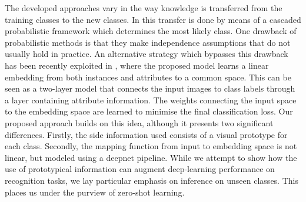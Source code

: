 \documentclass{bmvc2k}
\begin{document}
The developed approaches vary in the way knowledge is transferred from the training classes 
to the new classes. In \cite{Lampert2014,Suzuki2014} this transfer is done by
means of a cascaded probabilistic framework which determines the most likely class. One drawback of
probabilistic methods is that they make independence assumptions that do not
usually hold in practice. An alternative strategy which bypasses this drawback
has been recently exploited in
\cite{akata2013label,romera2015embarrassingly,weston2011wsabie}, where the
proposed model learns a linear embedding from both instances and attributes to a common space.
This can be seen as a two-layer model that connects the input images to class
labels through a layer containing attribute information. The weights connecting
the input space to the embedding space are learned to minimise the final
classification loss. Our proposed approach builds on this idea, although it presents two
significant differences. Firstly, the side information used consists of a
visual prototype for each class. Secondly, the mapping function from input to
embedding space is not linear, but modeled using a deepnet pipeline.
While we attempt to show how the use of prototypical information can augment deep-learning
performance on recognition tasks, we lay particular emphasis on inference on unseen classes.
This places us under the purview of zero-shot learning.
\fi\iffalse
With datasets such as for traffic signs or brand logos, the classification task amounts to a
fine-grained recognition. In this case, manually identifying visual attributes to uniquely define
each class is not only laborious but almost impossible with very small semantic difference between
some classes as in Fig. Establishing natural language semantics for these datasets is also not trivial. 
In case of brand logos, the class names have an ambiguous, often unrelated, natural language context. 
In case of traffic signs, the road sign phrases are difficult to mine preserving their complete meaning. 
Thus, in a first of its kind, we use canonical templates or prototypes to define the output embedding space.
\fi
\end{document}
